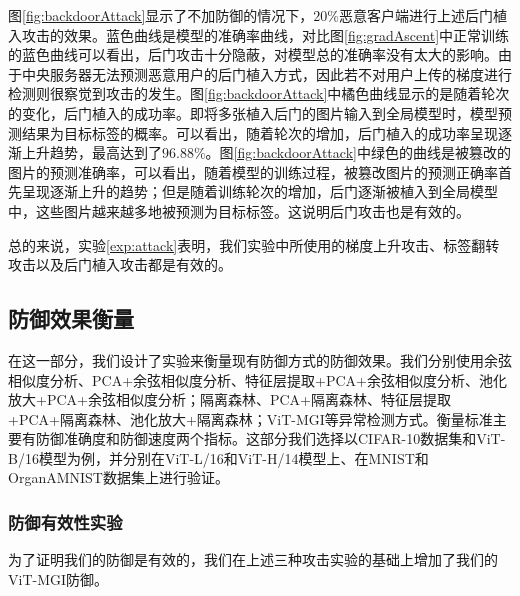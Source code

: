 \documentclass[conference]{IEEEtran}
\begin{document}
图\hyperref[fig:backdoorAttack]{\ref{fig:backdoorAttack}}显示了不加防御的情况下，$20\%$恶意客户端进行上述后门植入攻击的效果。蓝色曲线是模型的准确率曲线，对比图\hyperref[fig:gradAscent]{\ref{fig:gradAscent}}中正常训练的蓝色曲线可以看出，后门攻击十分隐蔽，对模型总的准确率没有太大的影响。由于中央服务器无法预测恶意用户的后门植入方式，因此若不对用户上传的梯度进行检测则很察觉到攻击的发生。图\hyperref[fig:backdoorAttack]{\ref{fig:backdoorAttack}}中橘色曲线显示的是随着轮次的变化，后门植入的成功率。即将多张植入后门的图片输入到全局模型时，模型预测结果为目标标签的概率。可以看出，随着轮次的增加，后门植入的成功率呈现逐渐上升趋势，最高达到了$96.88\%$。图\hyperref[fig:backdoorAttack]{\ref{fig:backdoorAttack}}中绿色的曲线是被篡改的图片的预测准确率，可以看出，随着模型的训练过程，被篡改图片的预测正确率首先呈现逐渐上升的趋势；但是随着训练轮次的增加，后门逐渐被植入到全局模型中，这些图片越来越多地被预测为目标标签。这说明后门攻击也是有效的。

总的来说，实验\hyperref[exp:attack]{\ref{exp:attack}}表明，我们实验中所使用的梯度上升攻击、标签翻转攻击以及后门植入攻击都是有效的。

\subsection{防御效果衡量}
\label{exp:defense}

在这一部分，我们设计了实验来衡量现有防御方式的防御效果。我们分别使用余弦相似度分析、PCA+余弦相似度分析、特征层提取+PCA+余弦相似度分析、池化放大+PCA+余弦相似度分析；隔离森林、PCA+隔离森林、特征层提取+PCA+隔离森林、池化放大+隔离森林；ViT-MGI等异常检测方式。衡量标准主要有防御准确度和防御速度两个指标。这部分我们选择以CIFAR-10数据集和ViT-B/16模型为例，并分别在ViT-L/16和ViT-H/14模型上、在MNIST和OrganAMNIST数据集上进行验证。



\subsubsection{\textbf{防御有效性实验}}
\label{exp:defenseEffectiveness}

为了证明我们的防御是有效的，我们在上述三种攻击实验的基础上增加了我们的ViT-MGI防御。
\end{document}
